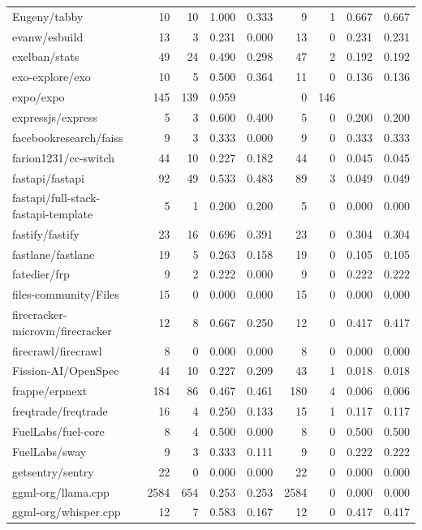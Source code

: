 \begin{tabular}{lrrrrrrrr}
Eugeny/tabby & 10 & 10 & 1.000 & 0.333 & 9 & 1 & 0.667 & 0.667 \\
evanw/esbuild & 13 & 3 & 0.231 & 0.000 & 13 & 0 & 0.231 & 0.231 \\
exelban/stats & 49 & 24 & 0.490 & 0.298 & 47 & 2 & 0.192 & 0.192 \\
exo-explore/exo & 10 & 5 & 0.500 & 0.364 & 11 & 0 & 0.136 & 0.136 \\
expo/expo & 145 & 139 & 0.959 &  & 0 & 146 &  &  \\
expressjs/express & 5 & 3 & 0.600 & 0.400 & 5 & 0 & 0.200 & 0.200 \\
facebookresearch/faiss & 9 & 3 & 0.333 & 0.000 & 9 & 0 & 0.333 & 0.333 \\
farion1231/cc-switch & 44 & 10 & 0.227 & 0.182 & 44 & 0 & 0.045 & 0.045 \\
fastapi/fastapi & 92 & 49 & 0.533 & 0.483 & 89 & 3 & 0.049 & 0.049 \\
fastapi/full-stack-fastapi-template & 5 & 1 & 0.200 & 0.200 & 5 & 0 & 0.000 & 0.000 \\
fastify/fastify & 23 & 16 & 0.696 & 0.391 & 23 & 0 & 0.304 & 0.304 \\
fastlane/fastlane & 19 & 5 & 0.263 & 0.158 & 19 & 0 & 0.105 & 0.105 \\
fatedier/frp & 9 & 2 & 0.222 & 0.000 & 9 & 0 & 0.222 & 0.222 \\
files-community/Files & 15 & 0 & 0.000 & 0.000 & 15 & 0 & 0.000 & 0.000 \\
firecracker-microvm/firecracker & 12 & 8 & 0.667 & 0.250 & 12 & 0 & 0.417 & 0.417 \\
firecrawl/firecrawl & 8 & 0 & 0.000 & 0.000 & 8 & 0 & 0.000 & 0.000 \\
Fission-AI/OpenSpec & 44 & 10 & 0.227 & 0.209 & 43 & 1 & 0.018 & 0.018 \\
frappe/erpnext & 184 & 86 & 0.467 & 0.461 & 180 & 4 & 0.006 & 0.006 \\
freqtrade/freqtrade & 16 & 4 & 0.250 & 0.133 & 15 & 1 & 0.117 & 0.117 \\
FuelLabs/fuel-core & 8 & 4 & 0.500 & 0.000 & 8 & 0 & 0.500 & 0.500 \\
FuelLabs/sway & 9 & 3 & 0.333 & 0.111 & 9 & 0 & 0.222 & 0.222 \\
getsentry/sentry & 22 & 0 & 0.000 & 0.000 & 22 & 0 & 0.000 & 0.000 \\
ggml-org/llama.cpp & 2584 & 654 & 0.253 & 0.253 & 2584 & 0 & 0.000 & 0.000 \\
ggml-org/whisper.cpp & 12 & 7 & 0.583 & 0.167 & 12 & 0 & 0.417 & 0.417 \\

\end{tabular}
